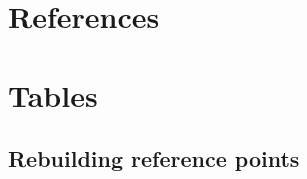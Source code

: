 \documentclass[11pt,
  english,
  a4paper,
]{article}
\begin{document}
\leavevmode\tagmcend\tagstructend\par

\clearpage


\hypertarget{references}{%
\section{References}\label{references}}

\leavevmode\tagmcend\tagstructend


\hypertarget{refs}{}

\leavevmode\tagmcend\tagstructend

\clearpage


\hypertarget{tables}{%
\section{Tables}\label{tables}}

\leavevmode\tagmcend\tagstructend


\hypertarget{rebuilding-reference-points-1}{%
\subsection{Rebuilding reference points}\label{rebuilding-reference-points-1}}

\leavevmode\tagmcend\tagstructend

\begingroup\fontsize{10}{12}\selectfont
\begingroup\fontsize{10}{12}\selectfont
\end{document}
